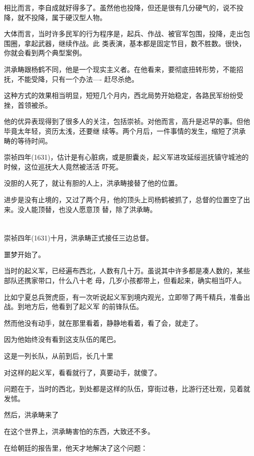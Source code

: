 \documentclass[11pt,a4paper,onecolumn]{article}
\begin{document}
相比而言，李自成就好得多了。虽然他也投降，但还是很有几分硬气的，说不投降，就不投降，属于硬汉型人物。

大体而言，当时许多民军的行为程序是，起兵、作战、被官军包围，投降，走出包围圈，拿起武器，继续作战。此
类表演，基本都是固定节目，数不胜数。很快，你就会看到两个典型案例。

洪承畴跟杨鹤不同，他是一个现实主义者。在他看来，要彻底扭转形势，不能招抚，不能受降，只有一个办法----
赶尽杀绝。

这种方式的效果相当明显，短短几个月内，西北局势开始稳定，各路民军纷纷受挫，首领被杀。

他的优异表现得到了很多人的关注，包括崇祯。对他而言，高升是迟早的事。但他毕竟太年轻，资历太浅，还要继
续等。两个月后，一件事情的发生，缩短了洪承畴的等待时间。

崇祯四年(1631)，估计是有心脏病，或是胆囊炎，起义军进攻延绥巡抚镇守城池的时候，这位巡抚大人竟然被活活
吓死。

没胆的人死了，就让有胆的人上，洪承畴接替了他的位置。

进步是没有止境的，又过了两个月，他的顶头上司杨鹤被抓了，总督的位置空了出来。没人能顶替，也没人愿意顶
替，除了洪承畴。

\section[\thesection]{}

崇祯四年(1631)十月，洪承畴正式接任三边总督。

噩梦开始了。

当时的起义军，已经遍布西北，人数有几十万。虽说其中许多都是凑人数的，某些部队还携家带口，什么八十老
母，几岁小孩都带上，但看起来，确实相当吓人。

比如宁夏总兵贺虎臣，有一次听说起义军到境内观光，立即带了两千精兵，准备出战。到地方后，他看到了起义军
的前锋队伍。

然而他没有动手，就在那里看着，静静地看着，看了会，就走了。

因为他始终没有看到这支队伍的尾巴。

这是一列长队，从前到后，长几十里

对这样的起义军，看看就行了，真要动手，就傻了。

问题在于，当时的西北，到处都是这样的队伍，穿街过巷，比游行还壮观，见着就发怵。

然后，洪承畴来了

在这个世界上，洪承畴害怕的东西，大致还不多。

在给朝廷的报告里，他天才地解决了这个问题：
\end{document}
